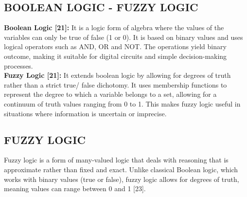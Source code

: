 \documentclass[12pt,a4paper]{article}
\begin{document}
\subsection{BOOLEAN LOGIC - FUZZY LOGIC}

\hspace{1em}\textbf{Boolean Logic [21]: } It is a logic form of algebra where the values of the variables can only be true of false (1 or 0). It is based on binary values and uses logical operators such as AND, OR and NOT. The operations yield binary outcome, making it suitable for digital circuits and simple decision-making processes.\\
    
\textbf{Fuzzy Logic [21]:} It extends boolean logic by allowing for degrees of truth rather than a strict true/ false dichotomy. It uses membership functions to represent the degree to which a variable belongs to a set, allowing for a continuum of truth values ranging from 0 to 1. This makes fuzzy logic useful in situations where information is uncertain or imprecise.

\subsection{FUZZY LOGIC}
\hspace{1em}Fuzzy logic is a form of many-valued logic that deals with reasoning that is approximate rather than fixed and exact. Unlike classical Boolean logic, which works with binary values (true or false), fuzzy logic allows for degrees of truth, meaning values can range between 0 and 1 [23].\\
\end{document}
